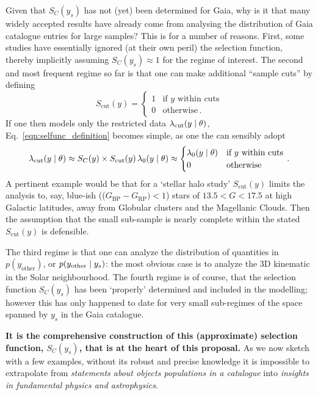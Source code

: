 Given that $S_C(y_s)$ has not (yet) been determined for Gaia, why is it that many widely accepted results have already come from analysing the distribution of Gaia catalogue entries for large samples? This is for a number of reasons. First, some studies have essentially ignored (at their own peril) the selection function, thereby implicitly assuming $S_C(y_s)\approx 1$ for the regime of interest. The second and most frequent regime so far is that one can make additional ``sample cuts'' by defining
\begin{equation*}
    S_\mathrm{cut}(y) = \begin{cases} 1 & \text{if } y \text{ within cuts} \\ 
0 &\text{otherwise}\,. \end{cases}
\end{equation*}
If one then models only the restricted data $\lambda_\mathrm{cut}(y\mid\theta)$, Eq.~\ref{eqn:selfunc_definition} becomes simple, as one the can sensibly adopt
\begin{equation*}
    \lambda_\mathrm{cut}(y\mid\theta) \approx S_C(y) \times S_\mathrm{cut}(y)\, \lambda_0(y\mid \theta) \approx  \begin{cases}  \lambda_0(y\mid\theta) &\text{if } y \text{ within cuts} \\ 
0 &\text{otherwise} \end{cases}\,.
\end{equation*}
A pertinent example would be that for a `stellar halo study' $S_\mathrm{cut}(y)$ limits the analysis to, say, blue-ish (($G_\mathrm{BP}-G_\mathrm{RP})<1$) stars of $13.5<G<17.5$ at high Galactic latitudes, away from Globular clusters and the Magellanic Clouds. Then the assumption that the small sub-sample is nearly complete within the stated $S_\mathrm{cut}(y)$ is defensible.

The third regime is that one can analyze the distribution of quantities in $p(y_\mathrm{other})$, or $p(y_\mathrm{other}\mid y_s)$: the most obvious case is to analyze the 3D kinematic in the Solar neighbourhood. The fourth regime is of course, that the selection function $S_C(y_s)$ has been `properly' determined and included in the modelling; however this has only happened to date for very small sub-regimes of the space spanned by $y_s$ in the Gaia catalogue.

\textbf{It is the comprehensive construction of this (approximate) selection function, $S_C(y_s)$, that is at the heart of this proposal.} As we now sketch with a few examples, without its robust and precise knowledge it is impossible to extrapolate from \textit{statements about objects populations in a catalogue} into \textit{insights in fundamental physics and astrophysics}.

